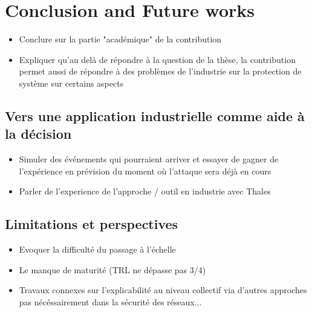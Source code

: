 \chapter{Conclusion and Future works}\label{ch:mathtest} %

\begin{itemize}

    \item Conclure sur la partie "académique" de la contribution
    \item Expliquer qu'au delà de répondre à la question de la thèse, la contribution permet aussi de répondre à des problèmes de l'industrie sur la protection de système sur certains aspects
\end{itemize}

\section{Vers une application industrielle comme aide à la décision}
\begin{itemize}

    \item Simuler des événements qui pourraient arriver et essayer de gagner de l'expérience en prévision du moment où l’attaque sera déjà en cours
    \item Parler de l'experience de l'approche / outil en industrie avec Thales
\end{itemize}

\section{Limitations et perspectives}

\begin{itemize}

    \item Evoquer la difficulté du passage à l'échelle
    \item Le manque de maturité (TRL ne dépasse pas 3/4)
    \item Travaux connexes sur l'explicabilité au niveau collectif via d'autres approches pas nécéssairement dans la sécurité des réseaux...
\end{itemize}

